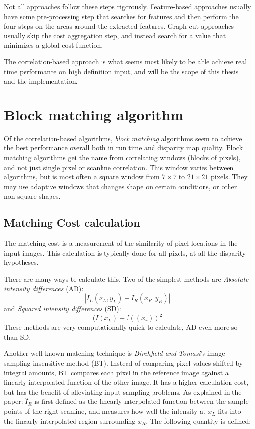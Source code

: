 Not all approaches follow these steps rigorously. Feature-based approaches
usually have some pre-processing step that searches for features and then
perform the four steps on the areas around the extracted features. Graph cut
approaches usually skip the cost aggregation step, and instead search for a
value that minimizes a global cost function.

The correlation-based approach is what seems most likely to be able achieve
real time performance on high definition input, and will be the scope of this
thesis and the implementation.

\section{Block matching algorithm}

Of the correlation-based algorithms, \textit{block matching} algorithms seem
to achieve the best performance overall both in run time and disparity map
quality\cite{taxonomy}. Block matching algorithms get the name from
correlating windows (blocks of pixels), and not just single pixel or scanline
correlation. This window varies between algorithms, but is most often a square
window from $7\times7$ to $21\times21$ pixels. They may use adaptive windows
that changes shape on certain conditions, or other non-square shapes.



\subsection{Matching Cost calculation}
\label{sec:matchingcost}

The matching cost is a measurement of the similarity of pixel locations in the
input images. This calculation is typically done for all pixels, at all the
disparity hypotheses.

There are many ways to calculate this. Two of the simplest methods are
\textit{Absolute intensity differences} (AD):
\begin{equation}
  | I_L(x_L,y_L) - I_R(x_R,y_R) |
\end{equation}
and \textit{Squared intensity differences} (SD):
\begin{equation}
  (I(x_L) - I((x_r))^2
\end{equation}
These methods are very computationally quick to calculate, AD even
more so than SD.

Another well known matching technique is \textit{Birchfield and   Tomasi}'s
image sampling insensitive method (BT)\cite{bt}. Instead of comparing pixel
values shifted by integral amounts, BT compares each pixel in the reference
image against a linearly interpolated function of the other image. It has a
higher calculation cost, but has the benefit of alleviating input sampling
problems. As explained in the paper: $\hat{I}_R$ is first defined as the
linearly interpolated function between the sample points of the right
scanline, and measures how well the intensity at $x_L$ fits into the linearly
interpolated region surrounding $x_R$. The following quantity is defined:

